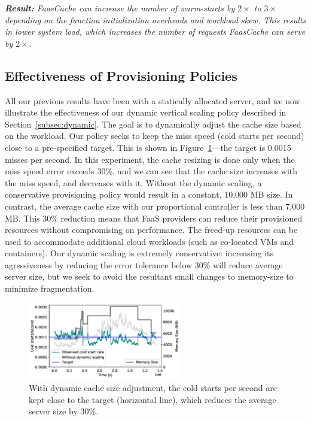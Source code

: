 \noindent \emph{\textbf{Result:} FaasCache can increase the number of warm-starts by $2\times$ to $3\times$ depending on the function initialization overheads and workload skew. This results in lower system load, which increases the number of requests FaasCache can serve by $2\times$.}


\subsection{Effectiveness of Provisioning Policies}
All our previous results have been with a statically allocated server, and 
we now illustrate the effectiveness of our dynamic vertical scaling policy described in Section~\ref{subsec:dynamic}.
The goal is to dynamically adjust the cache size based on the workload. 
Our  policy seeks to keep the miss speed (cold starts per second) close to a pre-specified target. 
This is shown in Figure~\ref{fig:dynamic}---the target is 0.0015 misses per second. 
In this experiment, the cache resizing is done only when the miss speed error exceeds 30\%, and we can see that the cache size increases with the miss speed, and decreases with it. 
Without the dynamic scaling, a conservative provisioning policy would result in a constant, 10,000 MB size. 
In contrast, the average cache size with our proportional controller is less than 7,000 MB.
This 30\% reduction means that FaaS providers can reduce their provisioned resources without compromising on performance.
The freed-up resources can be used to accommodate additional cloud workloads (such as co-located VMs and containers). 
Our dynamic scaling is extremely conservative: increasing its agressiveness by reducing the error tolerance below 30\% will reduce  average server size,
but we seek to avoid the resultant small changes to memory-size to minimize fragmentation. 

\begin{figure}[t]
  \centering 
  \includegraphics[width=0.6\textwidth]{faascache/faas-keepalive-20/graphs/dyn-scale-392-b.pdf}
  \caption{With dynamic cache size adjustment, the cold starts per second are kept close to the target (horizontal line), which reduces the average server size by 30\%. }
  \label{fig:dynamic}
\end{figure}

